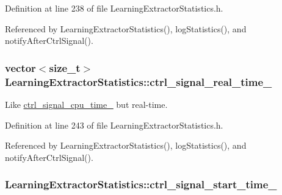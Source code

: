 Definition at line 238 of file Learning\-Extractor\-Statistics.\-h.



Referenced by Learning\-Extractor\-Statistics(), log\-Statistics(), and notify\-After\-Ctrl\-Signal().

\hypertarget{classLearningExtractorStatistics_ae75aebbe85e3b916e922b9472cb5474f}{
\subsubsection[{ctrl\-\_\-signal\-\_\-real\-\_\-time\-\_\-}]{\setlength{\rightskip}{0pt plus 5cm}vector$<$size\-\_\-t$>$ Learning\-Extractor\-Statistics\-::ctrl\-\_\-signal\-\_\-real\-\_\-time\-\_\-\hspace{0.3cm}{\ttfamily [protected]}}}\label{classLearningExtractorStatistics_ae75aebbe85e3b916e922b9472cb5474f}


Like \hyperlink{classLearningExtractorStatistics_a836a3f1d0bdf023577056a8b05f769ca}{ctrl\-\_\-signal\-\_\-cpu\-\_\-time\-\_\-} but real-\/time. 



Definition at line 243 of file Learning\-Extractor\-Statistics.\-h.



Referenced by Learning\-Extractor\-Statistics(), log\-Statistics(), and notify\-After\-Ctrl\-Signal().

\hypertarget{classLearningExtractorStatistics_aaf7283a491c91200e03e0ca29f7bcd93}{
\subsubsection[{ctrl\-\_\-signal\-\_\-start\-\_\-time\-\_\-}]{ Learning\-Extractor\-Statistics\-::ctrl\-\_\-signal\-\_\-start\-\_\-time\-\_\-\hspace{0.3cm}{\ttfamily [protected]}}}\label{classLearningExtractorStatistics_aaf7283a491c91200e03e0ca29f7bcd93}


